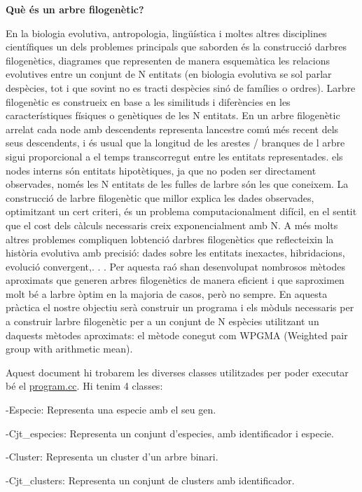{\bfseries{Què és un arbre filogenètic?}}

En la biologia evolutiva, antropologia, lingüística i moltes altres disciplines científiques un dels problemes principals que s\textquotesingle{}aborden és la construcció d\textquotesingle{}arbres filogenètics, diagrames que representen de manera esquemàtica les relacions evolutives entre un conjunt de N entitats (en biologia evolutiva se sol parlar d\textquotesingle{}espècies, tot i que sovint no es tracti d\textquotesingle{}espècies sinó de famílies o ordres). L\textquotesingle{}arbre filogenètic es construeix en base a les similituds i diferències en les característiques físiques o genètiques de les N entitats. En un arbre filogenètic arrelat cada node amb descendents representa l\textquotesingle{}ancestre comú més recent dels seus descendents, i és usual que la longitud de les arestes / branques de l\textquotesingle{} arbre sigui proporcional a el temps transcorregut entre les entitats representades. els nodes interns són entitats hipotètiques, ja que no poden ser directament observades, només les N entitats de les fulles de l\textquotesingle{}arbre són les que coneixem. La construcció de l\textquotesingle{}arbre filogenètic que millor explica les dades observades, optimitzant un cert criteri, és un problema computacionalment difícil, en el sentit que el cost dels càlculs necessaris creix exponencialment amb N. A més molts altres problemes compliquen l\textquotesingle{}obtenció d\textquotesingle{}arbres filogenètics que reflecteixin la història evolutiva amb precisió\+: dades sobre les entitats inexactes, hibridacions, evolució convergent,. . . Per aquesta raó s\textquotesingle{}han desenvolupat nombrosos mètodes aproximats que generen arbres filogenètics de manera eficient i que s\textquotesingle{}aproximen molt bé a l\textquotesingle{}arbre òptim en la majoria de casos, però no sempre. En aquesta pràctica el nostre objectiu serà construir un programa i els mòduls necessaris per a construir l\textquotesingle{}arbre filogenètic per a un conjunt de N espècies utilitzant un d\textquotesingle{}aquests mètodes aproximats\+: el mètode conegut com W\+P\+G\+MA (Weighted pair group with arithmetic mean).

Aquest document hi trobarem les diverses classes utilitzades per poder executar bé el \mbox{\hyperlink{program_8cc}{program.\+cc}}. Hi tenim 4 classes\+: \begin{DoxyVerb}-Especie: Representa una especie amb el seu gen.

-Cjt_especies: Representa un conjunt d'especies, amb identificador i especie.

-Cluster: Representa un cluster d'un arbre binari.

-Cjt_clusters: Representa un conjunt de clusters amb identificador.
\end{DoxyVerb}


